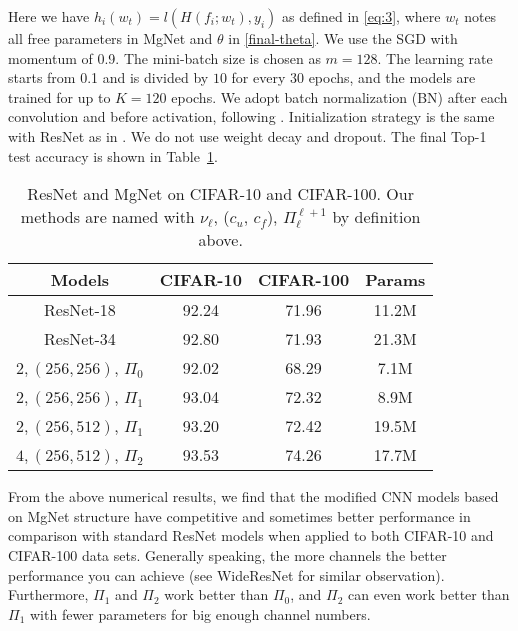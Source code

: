 Here we have $h_i(w_t) = l(H(f_i;w_t),y_i)$ as defined in \eqref{eq:3}, where $w_t$ notes all free parameters in MgNet and $\theta$ in \eqref{final-theta}.
We use the SGD with momentum of 0.9. 
The mini-batch size is chosen as
$m=128$. The learning rate starts from 0.1 and is divided by $10$ for
every $30$ epochs, and the models are trained for up to $K=120$ epochs.
We adopt batch normalization (BN) after each convolution and before
activation, following \cite{ioffe2015batch}.  Initialization strategy
is the same with ResNet as in \cite{he2015delving}.  We
do not use weight decay and dropout.  The final Top-1 test accuracy is
shown in Table~\ref{comparison}.
\begin{table}[!htbp]
	\caption{ResNet and MgNet on CIFAR-10 and CIFAR-100. 
	Our methods are named with $\nu_\ell$, ($c_u$, $c_f$), $\Pi_\ell^{\ell+1}$ by definition above.}
	\label{comparison}
	\vskip 0.15in
	\begin{center}
				\begin{tabular}{cccc}
					\hline
					Models & CIFAR-10 & CIFAR-100 & Params \\
					\hline
					ResNet-18 & 92.24 & 71.96 & 11.2M   \\
					ResNet-34 & 92.80 & 71.93 & 21.3M   \\
					\hline
					$2, (256,256)$, $\Pi_0$ & 92.02 & 68.29 & 7.1M  \\
					$2, (256,256)$, $\Pi_1$ & 93.04 & 72.32 & 8.9M  \\
					$2, (256,512)$, $\Pi_1$ & 93.20 & 72.42 & 19.5M  \\ 
					$4, (256,512)$, $\Pi_2$ & 93.53& 74.26 & 17.7M  \\ 
					\hline
				\end{tabular} 
	\end{center}
	\vskip -0.1in
\end{table}

From the above numerical results, we find that the modified CNN models
based on MgNet structure have competitive and sometimes better
performance in comparison with standard ResNet models when applied to
both CIFAR-10 and CIFAR-100 data sets. Generally speaking, the more
channels the better performance you can achieve (see WideResNet
\cite{zagoruyko2016wide} for similar observation). Furthermore,
$\Pi_1$ and $\Pi_2$ work better than $\Pi_0$, and $\Pi_2$ can even
work better than $\Pi_1$ with fewer parameters for big enough 
channel numbers.


